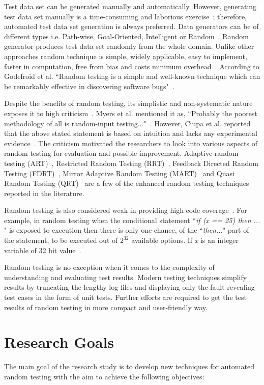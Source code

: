 Test data set can be generated manually and automatically. However, generating test data set manually is a time-consuming and laborious exercise~\cite{korel1990}; therefore, automated test data set generation is always preferred. Data generators can be of different types i.e. Path-wise, Goal-Oriented, Intelligent or Random~\cite{wiki2013}. Random generator produces test data set randomly from the whole domain. Unlike other approaches random technique is simple, widely applicable, easy to implement, faster in computation, free from bias and costs minimum overhead~\cite{Ciupa2007}. According to Godefroid et al. ``Random testing is a simple and well-known technique which can be remarkably effective in discovering software bugs"~\cite{Godefroid2005}.

Despite the benefits of random testing, its simplistic and non-systematic nature exposes it to high criticism~\cite{white1987}. Myers et al. mentioned it as, ``Probably the poorest methodology of all is random-input testing..."~\cite{Myers2011}. However, Ciupa et al. reported that the above stated statement is based on intuition and lacks any experimental evidence~\cite{Ciupa2008a}. The criticism motivated the researchers to look into various aspects of random testing for evaluation and possible improvement. Adaptive random testing (ART)~\cite{Chen2008}, Restricted Random Testing (RRT)~\cite{Chan2002}, Feedback Directed Random Testing (FDRT)~\cite{Pacheco2007}, Mirror Adaptive Random Testing (MART)~\cite{Chen2003} and Quasi Random Testing (QRT)~\cite{Chen2005} are a few of the enhanced random testing techniques reported in the literature.

Random testing is also considered weak in providing high code coverage~\cite{cohen1997, Offutt1996}. For example, in random testing when the conditional statement  ``{\it if (x == 25) then ... }"  is exposed to execution then there is only one chance, of the ``{\it then...}" part of the statement, to be executed out of $2^\text{32}$ available options. If {\it x} is an integer variable of 32 bit value~\cite{Godefroid2005}. 

Random testing is no exception when it comes to the complexity of understanding and evaluating test results. Modern testing techniques simplify results by truncating the lengthy log files and displaying only the fault revealing test cases in the form of unit tests. Further efforts are required to get the test results of random testing in more compact and user-friendly way. 


\section{Research Goals} \label{ResearchGoals}
The main goal of the research study is to develop new techniques for automated random testing with the aim to achieve the following objectives:

